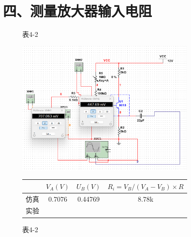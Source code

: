\documentclass[a4paper,10pt,notitlepage]{article}
\begin{document}
	\section*{四、测量放大器输入电阻}
	\begin{figure}[h]
		\centering
		
		\caption*{表4-2 }
	\end{figure}
	\begin{figure}[h]
		\centering
		\includegraphics[width=0.8\textwidth]{10.png}
		\begin{tabular}{|c|c|c|c|}
			\hline
			& $V_A(V)$ & $U_B(V)$ & $R_i=V_B/(V_A-V_B) \times R$ \\
			\hline
			仿真 & 0.7076 & 0.44769 & 8.78k  \\
			\hline
			实验 & \quad & \quad & \qquad  \\
			\hline
		\end{tabular}
		\caption*{表4-2 }
	\end{figure}
\end{document}
